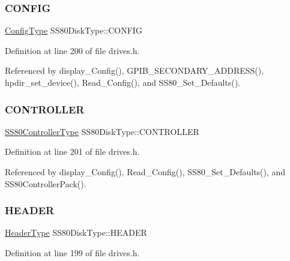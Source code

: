 \subsubsection{\texorpdfstring{C\+O\+N\+F\+IG}{CONFIG}}
{\footnotesize\ttfamily \hyperlink{structConfigType}{Config\+Type} S\+S80\+Disk\+Type\+::\+C\+O\+N\+F\+IG}



Definition at line 200 of file drives.\+h.



Referenced by display\+\_\+\+Config(), G\+P\+I\+B\+\_\+\+S\+E\+C\+O\+N\+D\+A\+R\+Y\+\_\+\+A\+D\+D\+R\+E\+S\+S(), hpdir\+\_\+set\+\_\+device(), Read\+\_\+\+Config(), and S\+S80\+\_\+\+Set\+\_\+\+Defaults().

\mbox{\label{structSS80DiskType_ae9da84cba5786cf755c388eba065c0cd}} 
\subsubsection{\texorpdfstring{C\+O\+N\+T\+R\+O\+L\+L\+ER}{CONTROLLER}}
{\footnotesize\ttfamily \hyperlink{structSS80ControllerType}{S\+S80\+Controller\+Type} S\+S80\+Disk\+Type\+::\+C\+O\+N\+T\+R\+O\+L\+L\+ER}



Definition at line 201 of file drives.\+h.



Referenced by display\+\_\+\+Config(), Read\+\_\+\+Config(), S\+S80\+\_\+\+Set\+\_\+\+Defaults(), and S\+S80\+Controller\+Pack().

\mbox{\label{structSS80DiskType_ae66c0130dee8c362743dfdfc41539c3b}} 
\subsubsection{\texorpdfstring{H\+E\+A\+D\+ER}{HEADER}}
{\footnotesize\ttfamily \hyperlink{structHeaderType}{Header\+Type} S\+S80\+Disk\+Type\+::\+H\+E\+A\+D\+ER}



Definition at line 199 of file drives.\+h.



